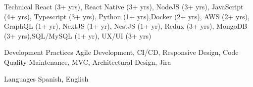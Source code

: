
\begin{cvskills}

  \cvskill
  {Technical} %
  {React (3+ yrs), React Native (3+ yrs), NodeJS (3+ yrs), JavaScript (4+ yrs),
  Typescript (3+ yrs), Python (1+ yrs),\newline Docker (2+ yrs), AWS (2+ yrs),
  GraphQL (1+ yr), NextJS (1+ yr), NestJS (1+ yr), Redux (3+ yrs),
  MongoDB (3+ yrs),\newline SQL/MySQL (1+ yr), UX/UI (3+ yrs)} %

  \cvskill
  {Development Practices} %
  {Agile Development, CI/CD, Responsive Design, Code Quality Maintenance, MVC, Architectural Design,
  Jira} %

  \cvskill
  {Languages} %
  {Spanish, English} %

\end{cvskills}
